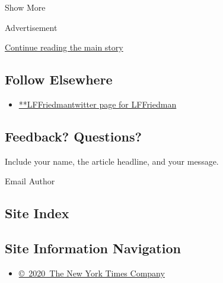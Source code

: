 Show More

Advertisement

\protect\hyperlink{after-mid2}{Continue reading the main story}

\hypertarget{follow-elsewhere}{%
\subsection{Follow Elsewhere}\label{follow-elsewhere}}

\begin{itemize}
\tightlist
\item
  \href{https://twitter.com/LFFriedman}{**LFFriedmantwitter page for
  LFFriedman}
\end{itemize}

\hypertarget{feedback-questions}{%
\subsection{Feedback? Questions?}\label{feedback-questions}}

Include your name, the article headline, and your message.

Email Author

\hypertarget{site-index}{%
\subsection{Site Index}\label{site-index}}

\hypertarget{site-information-navigation}{%
\subsection{Site Information
Navigation}\label{site-information-navigation}}

\begin{itemize}
\tightlist
\item
  \href{https://help.nytimes3xbfgragh.onion/hc/en-us/articles/115014792127-Copyright-notice}{©~2020~The
  New York Times Company}
\end{itemize}

